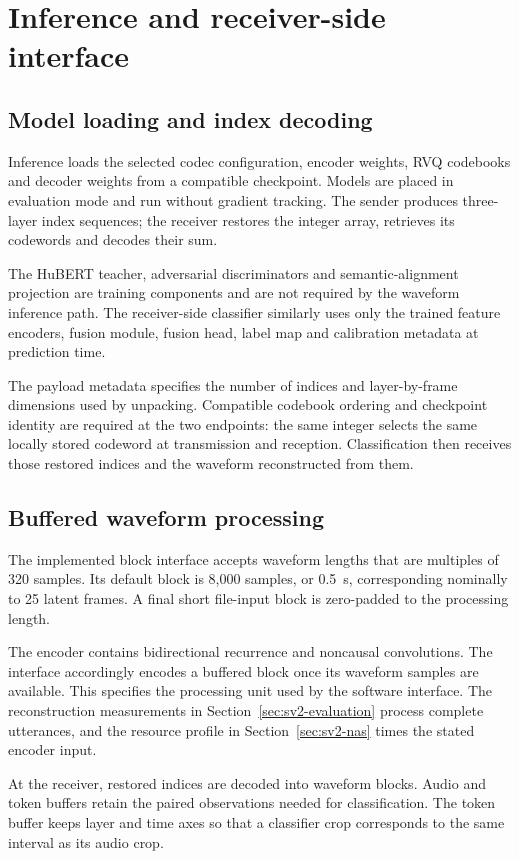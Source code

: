 \section{Inference and receiver-side interface}
\label{sec:sv2-inference}

\subsection{Model loading and index decoding}
Inference loads the selected codec configuration, encoder weights, RVQ codebooks and decoder weights from a compatible checkpoint. Models are placed in evaluation mode and run without gradient tracking. The sender produces three-layer index sequences; the receiver restores the integer array, retrieves its codewords and decodes their sum.

The HuBERT teacher, adversarial discriminators and semantic-alignment projection are training components and are not required by the waveform inference path. The receiver-side classifier similarly uses only the trained feature encoders, fusion module, fusion head, label map and calibration metadata at prediction time.

The payload metadata specifies the number of indices and layer-by-frame dimensions used by unpacking. Compatible codebook ordering and checkpoint identity are required at the two endpoints: the same integer selects the same locally stored codeword at transmission and reception. Classification then receives those restored indices and the waveform reconstructed from them.

\subsection{Buffered waveform processing}
The implemented block interface accepts waveform lengths that are multiples of 320 samples. Its default block is 8,000 samples, or 0.5~s, corresponding nominally to 25 latent frames. A final short file-input block is zero-padded to the processing length.

The encoder contains bidirectional recurrence and noncausal convolutions. The interface accordingly encodes a buffered block once its waveform samples are available. This specifies the processing unit used by the software interface. The reconstruction measurements in Section~\ref{sec:sv2-evaluation} process complete utterances, and the resource profile in Section~\ref{sec:sv2-nas} times the stated encoder input.

At the receiver, restored indices are decoded into waveform blocks. Audio and token buffers retain the paired observations needed for classification. The token buffer keeps layer and time axes so that a classifier crop corresponds to the same interval as its audio crop.

